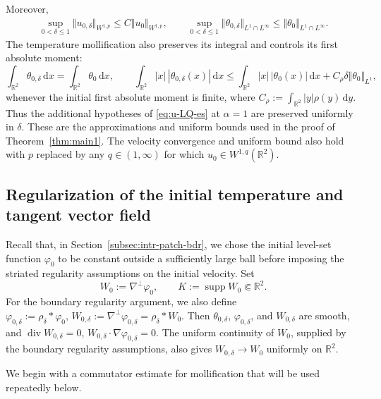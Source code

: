 \documentclass[reqno,11pt,a4paper]{amsart}
\newcommand{\dd}{\mathrm{d}}
\begin{document}
Moreover,
\begin{align*}
  \sup_{0<\delta\leq1}
  \Vert u_{0,\delta}\Vert _{W^{1,p}}
  \leq C\Vert u_0\Vert _{W^{1,p}},\qquad
  \sup_{0<\delta\leq1}
  \Vert \theta_{0,\delta}\Vert _{L^1\cap L^\infty}
  \leq \Vert \theta_0\Vert _{L^1\cap L^\infty}.
\end{align*}
The temperature mollification also preserves its integral
and controls its first absolute moment:
\[
  \int_{\mathbb R^2}\theta_{0,\delta}\,\dd x
  =\int_{\mathbb R^2}\theta_0\,\dd x,
  \qquad
  \int_{\mathbb R^2}|x|\,|\theta_{0,\delta}(x)|\,\dd x
  \leq \int_{\mathbb R^2}|x|\,|\theta_0(x)|\,\dd x
       +C_\rho\delta\Vert \theta_0\Vert _{L^1},
\]
whenever the initial first absolute moment is finite,
where $C_\rho:=\int_{\mathbb R^2}|y|\rho(y)\,\dd y$.
Thus the additional hypotheses of \eqref{eq:u-LQ-es}
at $\alpha=1$ are preserved uniformly in $\delta$.
These are the approximations and uniform bounds
used in the proof of Theorem~\ref{thm:main1}.
The velocity convergence and uniform bound also hold
with $p$ replaced by any $q\in(1,\infty)$
for which $u_0\in W^{1,q}(\mathbb R^2)$.

\subsection{Regularization of the initial temperature
and tangent vector field}\label{sec:A2}

Recall that, in Section~\ref{subsec:intr-patch-bdr},
we chose the initial level-set function $\varphi_0$
to be constant outside a sufficiently large ball
before imposing the striated regularity assumptions
on the initial velocity.
Set
\[
  W_0:=\nabla^\perp\varphi_0,
  \qquad K:=\operatorname{supp}W_0\Subset\mathbb R^2.
\]
For the boundary regularity argument, we also define $\varphi_{0,\delta}:=\rho_\delta*\varphi_0,\,W_{0,\delta}:=\nabla^\perp\varphi_{0,\delta}
  =\rho_\delta*W_0$. 
Then $\theta_{0,\delta}$, $\varphi_{0,\delta}$,
and $W_{0,\delta}$ are smooth, and
 $\operatorname{div}W_{0,\delta}=0,\,W_{0,\delta}\cdot\nabla\varphi_{0,\delta}=0$. 
The uniform continuity of $W_0$, supplied by
the boundary regularity assumptions, also gives
$W_{0,\delta}\to W_0$ uniformly on $\mathbb R^2$.

We begin with a commutator estimate for mollification
that will be used repeatedly below.
\end{document}
